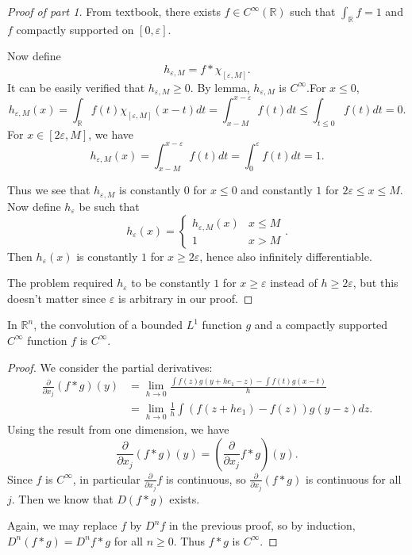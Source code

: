 \newpage
\begin{proof}[Proof of part 1]
	From textbook, there exists $f \in C^\infty (\mathbb{R})$ such that $\int _{\mathbb{R}} f = 1$ and $f$ compactly supported on  $[0,\varepsilon]$.

	Now define
	\[
		h_{\varepsilon, M} = f * \chi_{[\varepsilon, M]}
	.\] 
	It can be easily verified that $h_{\varepsilon, M} \ge 0$. By lemma, $h_{\varepsilon, M}$ is $C^\infty $.For $x \le 0$,
	\[
		h_{\varepsilon, M}(x)
		= \int_{\mathbb{R}} f(t)\chi_{[\varepsilon, M]}(x - t) d t
		= \int_{x - M}^{x - \varepsilon} f(t) d t
		\le \int _{t \le 0} f(t) d t  
		= 0
	.\] 
	For $x \in [2\varepsilon, M ]$, we have
	\[
		h_{\varepsilon, M}(x)
		= \int _{x - M}^{x - \varepsilon} f(t) d t
		= \int _{0}^\varepsilon f(t) d t = 1
	.\] 

	Thus we see that $h_{\varepsilon, M}$ is constantly $0$ for $x \le 0$ and constantly $1$ for  $2 \varepsilon \le x \le M$. Now define $h_{\varepsilon}$ be such that
	\[
		h_\varepsilon(x) = 
		\begin{cases}
			h_{\varepsilon, M}(x) & x \le M \\
			1 & x > M
		\end{cases}
	.\] 
	Then $h_\varepsilon(x)$ is constantly $1$ for $x \ge 2 \varepsilon$, hence also infinitely differentiable.

	The problem required $h_\varepsilon$ to be constantly $1$ for $x \ge \varepsilon$ instead of $h \ge 2 \varepsilon$, but this doesn't matter since $\varepsilon$ is arbitrary in our proof.
\end{proof}
\newpage

\begin{lemma}
	In $\mathbb{R}^n$, the convolution of a bounded $L^1$ function $g$ and a compactly supported $C^\infty $ function $f$ is $C^{\infty } $.
\end{lemma}
\begin{proof}
	We consider the partial derivatives:
	\begin{align*}
		\frac{\partial }{\partial x_j} (f * g) (y) 
		&= \lim_{h \to 0} \frac{\int f(z)g(y+h e_1  - z ) - \int f(t) g(x - t)}{h} \\
		&= \lim_{h \to 0} \frac{1}{h} \int  \left( f(z + h e_1) - f(z) \right) g(y - z) d z 
	.\end{align*}
	Using the result from one dimension, we have
	\[
		\frac{\partial }{\partial x_j} (f * g)(y)= \left( \frac{\partial }{\partial x_j} f * g \right) (y)
	.\] 
	Since $f$ is $C^\infty $, in particular $\frac{\partial }{\partial x_j} f$ is continuous, so $\frac{\partial }{\partial x_j} (f * g)$ is continuous for all $j$. Then we know that $D(f * g) $ exists.

	Again, we may replace $f$ by $D^nf$ in the previous proof, so by induction, $D^n (f * g) = D^n  f * g$ for all $n \ge 0$. Thus $f * g$ is $C^\infty $.
	
\end{proof}



